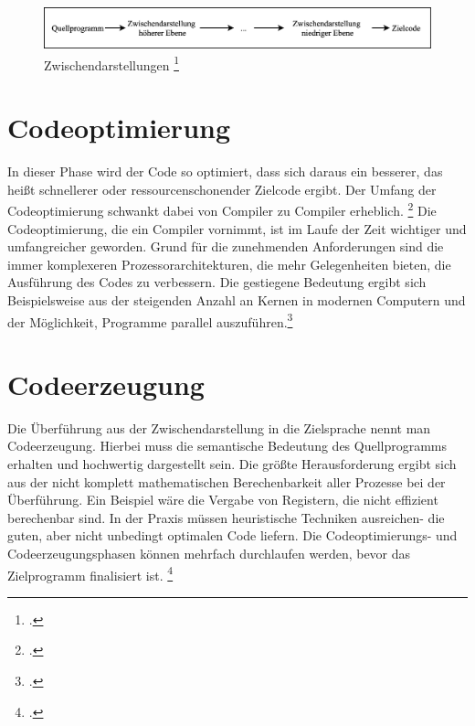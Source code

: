 \begin{figure}[!ht]
 \includegraphics[width=\textwidth,keepaspectratio]{Images/Compiler/Zwischendarstellungen.png}
 \caption[Zwischendarstellungen]{Zwischendarstellungen \protect\footcite{Ullmann2008} }
 \label{fig:Zwischendarstellung}
\end{figure}

\section{Codeoptimierung}
In dieser Phase  wird der Code so optimiert, dass sich daraus ein besserer,  das heißt schnellerer oder ressourcenschonender Zielcode ergibt.  Der Umfang der Codeoptimierung schwankt dabei von Compiler zu Compiler erheblich.  \footcite[Vgl.][S. 11f]{Ullmann2008} 
Die Codeoptimierung, die ein Compiler vornimmt, ist im Laufe der Zeit wichtiger und umfangreicher geworden. Grund für die zunehmenden Anforderungen sind die immer komplexeren Prozessorarchitekturen, die mehr Gelegenheiten bieten, die Ausführung des  Codes zu verbessern. Die gestiegene Bedeutung ergibt sich Beispielsweise aus der steigenden Anzahl an Kernen in modernen Computern und der Möglichkeit, Programme parallel auszuführen.\footcite[Vgl.][S. 20]{Ullmann2008}

\section{Codeerzeugung}
Die Überführung aus der Zwischendarstellung in die Zielsprache nennt man Codeerzeugung.  Hierbei muss die semantische Bedeutung des Quellprogramms erhalten und hochwertig dargestellt sein. Die größte Herausforderung ergibt sich aus der nicht komplett mathematischen Berechenbarkeit aller Prozesse bei der Überführung. Ein Beispiel wäre die Vergabe von Registern,  die nicht effizient berechenbar sind.  In der Praxis müssen heuristische Techniken ausreichen- die guten, aber nicht unbedingt optimalen Code liefern.  Die Codeoptimierungs- und  Codeerzeugungsphasen können mehrfach durchlaufen werden,  bevor das Zielprogramm finalisiert ist. \footcite[Vgl.][S. 618f]{Ullmann2008}


